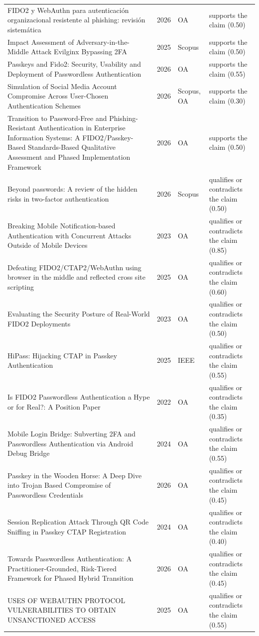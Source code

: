 \begin{longtable}{@{}%
  >{\raggedright\arraybackslash}p{}c%
  >{\raggedright\arraybackslash}p{}%
  >{\raggedright\arraybackslash}p{}@{}}
FIDO2 y WebAuthn para autenticación organizacional resistente al phishing: revisión sistemática & 2026 & OA & supports the claim (0.50) \\
Impact Assessment of Adversary-in-the-Middle Attack Evilginx Bypassing 2FA & 2025 & Scopus & supports the claim (0.50) \\
Passkeys and Fido2: Security, Usability and Deployment of Passwordless Authentication & 2026 & OA & supports the claim (0.55) \\
Simulation of Social Media Account Compromise Across User-Chosen Authentication Schemes & 2026 & Scopus, OA & supports the claim (0.30) \\
Transition to Password-Free and Phishing-Resistant Authentication in Enterprise Information Systems: A FIDO2/Passkey-Based Standards-Based Qualitative Assessment and Phased Implementation Framework & 2026 & OA & supports the claim (0.50) \\
Beyond passwords: A review of the hidden risks in two-factor authentication & 2026 & Scopus & qualifies or contradicts the claim (0.50) \\
Breaking Mobile Notification-based Authentication with Concurrent Attacks Outside of Mobile Devices & 2023 & OA & qualifies or contradicts the claim (0.85) \\
Defeating FIDO2/CTAP2/WebAuthn using browser in the middle and reflected cross site scripting & 2025 & OA & qualifies or contradicts the claim (0.60) \\
Evaluating the Security Posture of Real-World FIDO2 Deployments & 2023 & OA & qualifies or contradicts the claim (0.50) \\
HiPass: Hijacking CTAP in Passkey Authentication & 2025 & IEEE & qualifies or contradicts the claim (0.55) \\
Is FIDO2 Passwordless Authentication a Hype or for Real?: A Position Paper & 2022 & OA & qualifies or contradicts the claim (0.35) \\
Mobile Login Bridge: Subverting 2FA and Passwordless Authentication via Android Debug Bridge & 2024 & OA & qualifies or contradicts the claim (0.55) \\
Passkey in the Wooden Horse: A Deep Dive into Trojan Based Compromise of Passwordless Credentials & 2026 & OA & qualifies or contradicts the claim (0.45) \\
Session Replication Attack Through QR Code Sniffing in Passkey CTAP Registration & 2024 & OA & qualifies or contradicts the claim (0.40) \\
Towards Passwordless Authentication: A Practitioner-Grounded, Risk-Tiered Framework for Phased Hybrid Transition & 2026 & OA & qualifies or contradicts the claim (0.45) \\
USES OF WEBAUTHN PROTOCOL VULNERABILITIES TO OBTAIN UNSANCTIONED ACCESS & 2025 & OA & qualifies or contradicts the claim (0.55) \\
\end{longtable}
\endgroup
